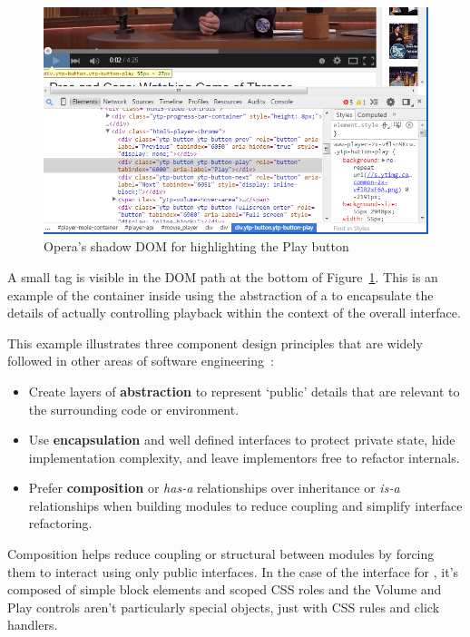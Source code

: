 \begin{figure}[htb]
\centerline{\includegraphics[width=6in]{images/html5_video_control.png}} 
\caption{Opera's shadow DOM for  highlighting the Play button}
\label{f:html5video}
\end{figure}

A small  tag is visible in the DOM path at the bottom of Figure~\ref{f:html5video}.
This is an example of the container inside  using the abstraction of a  to encapsulate the details of actually controlling playback within the context of the overall  interface.

This example illustrates three component design principles that are widely followed in other areas of software engineering~\cite{fowler2012}:
\begin{itemize}
\item Create layers of \textbf{abstraction} to represent `public' details that are relevant to the surrounding code or environment.
\item Use \textbf{encapsulation} and well defined interfaces to protect private state, hide implementation complexity, and leave implementors free to refactor internals.
\item Prefer \textbf{composition} or \textit{has-a} relationships over inheritance or \textit{is-a} relationships when building modules to reduce coupling and simplify interface refactoring.
\end{itemize}

Composition helps reduce coupling or structural between modules by forcing them to interact using only public interfaces.
In the case of the interface for , it's composed of simple block elements and scoped CSS roles and the Volume and Play controls aren't particularly special objects, just  with CSS rules and click handlers.

